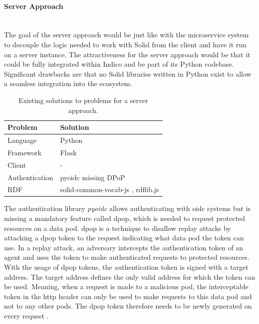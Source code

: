 \paragraph{Server Approach}\mbox{}\\

The goal of the server approach would be just like with the microservice system to decouple the logic needed to work with Solid from the client and have it run on a server instance. The attractiveness for the server approach would be that it could be fully integrated within Indico and be part of its Python codebase. Significant drawbacks are that no Solid libraries written in Python exist to allow a seamless integration into the ecosystem.

\begin{table}[!ht]
    \centering
    \begin{tabular}{| l | l |} 
    \hline
     Problem & Solution \\
     \hline
      Language & Python  \\
      Framework & Flask  \\
      Client & -  \\
      Authentication & pyoidc \cite{pyoidc} missing DPoP\\
      RDF & solid-common-vocab-js \cite{solid-common-vocab-js}, rdflib.js \cite{rdflib-js}  \\
    \hline
    \end{tabular}
    \vspace{0.75cm}
    \caption{Existing solutions to problems for a server approach.}
    \label{table:3}
\end{table}

The authentication library \textit{pyoidc} allows authenticating with \gls{oidc} systems but is missing a mandatory feature called \gls{dpop}, which is needed to request protected resources on a data pod. \gls{dpop} is a technique to disallow replay attacks by attaching a \gls{dpop} token to the request indicating what data pod the token can use. In a replay attack, an adversary intercepts the authentication token of an agent and uses the token to make authenticated requests to protected resources. With the usage of \gls{dpop} tokens, the authentication token is signed with a target address. The target address defines the only valid address for which the token can be used. Meaning, when a request is made to a malicious pod, the interceptable token in the \gls{http} header can only be used to make requests to this data pod and not to any other pods. The \gls{dpop} token therefore needs to be newly generated on every request \cite{dpop-spec}.

